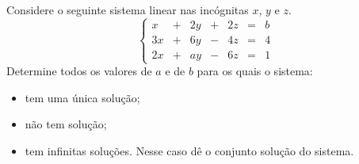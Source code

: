 \begin{problem} 
Considere o seguinte sistema linear nas incógnitas $x$, $y$ e $z$.
$$\left\{\begin{array}{rrrrrrr}
 x & + &  2y & + &  2z & = &  b\\
3x & + &  6y & - &  4z & = &  4\\
2x & + &  ay & - &  6z & = &  1
\end{array} \right.$$
\noindent Determine todos os valores de $a$ e de $b$ para os quais o sistema:
\begin{itemize}
\item[(a)] tem uma única solução;
\item[(b)] não tem solução;
\item[(c)] tem infinitas soluções. Nesse caso dê o conjunto solução do sistema.
\end{itemize}
\end{problem}
